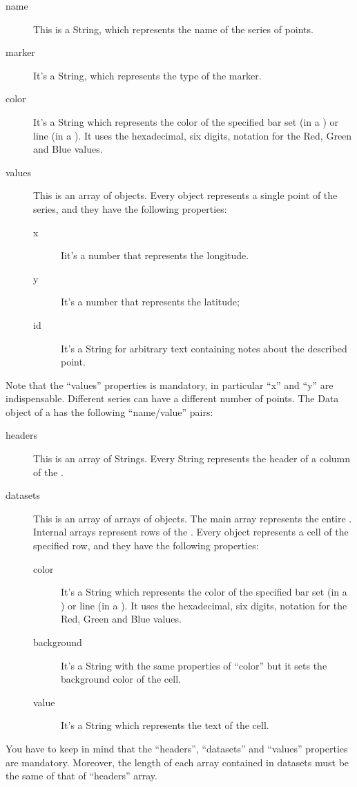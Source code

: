 				\begin{description}
					\item[name] This is a String, which represents the name of the series of points.
					\item[marker] It's a String, which represents the type of the marker.
					\item[color] It's a String which represents the color of the specified bar set (in a ) or line (in a ). It uses the hexadecimal, six digits, notation for the Red, Green and Blue values. 
					\item[values] This is an array of objects. Every object represents a single point of the series, and they have the following properties:
						\begin{description}
							\item[x] Iit's a number that represents the longitude.
							\item[y] It's a number that represents the latitude;
							\item[id] It's a String for arbitrary text containing notes about the described point.
						\end{description}
				\end{description}
				Note that the “values” properties is mandatory, in particular “x” and “y” are indispensable. Different series can have a different number of points.
				The Data object of a  has the following “name/value” pairs:
				\begin{description}
					\item[headers] This is an array of Strings. Every String represents the header of a column of the .
					\item[datasets] This is an array of arrays of objects. The main array represents the entire . Internal arrays represent rows of the . Every object represents a cell of the specified row, and they have the following properties:
					\begin{description}
						\item[color] It's a String which represents the color of the specified bar set (in a ) or line (in a ). It uses the hexadecimal, six digits, notation for the Red, Green and Blue values. 
						\item[background] It's a String with the same properties of “color” but it sets the background color of the cell.
						\item[value] It's a String which represents the text of the cell.
					\end{description}
				\end{description}
				You have to keep in mind that the “headers”, “datasets” and “values” properties are mandatory. Moreover, the length of each array contained in datasets must be the same of that of “headers” array.

